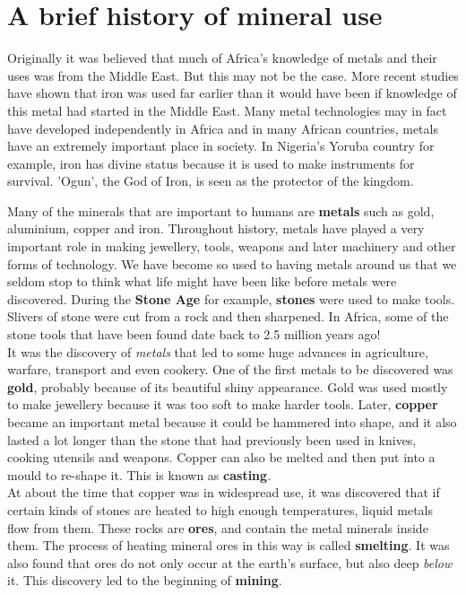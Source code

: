 



\section{A brief history of mineral use}

\begin{IFact}{
Originally it was believed that much of Africa's knowledge of metals and their uses was from the Middle East. But this may not be the case. More recent studies have shown that iron was used far earlier than it would have been if knowledge of this metal had started in the Middle East. Many metal technologies may in fact have developed independently in Africa and in many African countries, metals have an extremely important place in society. In Nigeria's Yoruba country for example, iron has divine status because it is used to make instruments for survival. 'Ogun', the God of Iron, is seen as the protector of the kingdom.
}
\end{IFact}
Many of the minerals that are important to humans are \textbf{metals} such as gold, aluminium, copper and iron. Throughout history, metals have played a very important role in making jewellery, tools, weapons and later machinery and other forms of technology. We have become so used to having metals around us that we seldom stop to think what life might have been like before metals were discovered. During the \textbf{Stone Age} for example, \textbf{stones} were used to make tools. Slivers of stone were cut from a rock and then sharpened. In Africa, some of the stone tools that have been found date back to 2.5 million years ago! \\

It was the discovery of \textit{metals} that led to some huge advances in agriculture, warfare, transport and even cookery. One of the first metals to be discovered was \textbf{gold}, probably because of its beautiful shiny appearance. Gold was used mostly to make jewellery because it was too soft to make harder tools. Later, \textbf{copper} became an important metal because it could be hammered into shape, and it also lasted a lot longer than the stone that had previously been used in knives, cooking utensils and weapons. Copper can also be melted and then put into a mould to re-shape it. This is known as \textbf{casting}. \\


At about the time that copper was in widespread use, it was discovered that if certain kinds of stones are heated to high enough temperatures, liquid metals flow from them. These rocks are \textbf{ores}, and contain the metal minerals inside them. The process of heating mineral ores in this way is called \textbf{smelting}. It was also found that ores do not only occur at the earth's surface, but also deep \textit{below} it. This discovery led to the beginning of \textbf{mining}.\\

